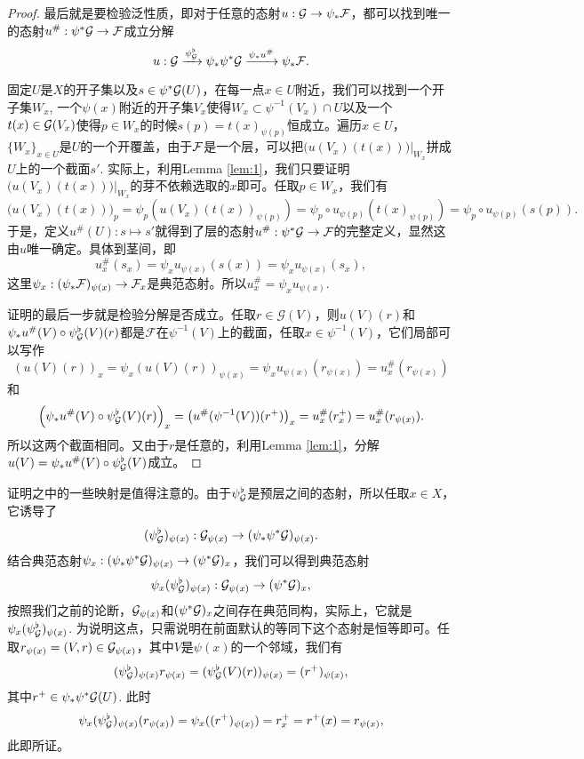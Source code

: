 \begin{proof}
	最后就是要检验泛性质，即对于任意的态射$u:\mathcal{G} \to \psi_*\mathcal{F}$，都可以找到唯一的态射$u^\#:\psi^*\mathcal{G} \to \mathcal{F}$成立分解
	\[
		u:\mathcal{G}\xrightarrow{\psi^\flat_{\mathcal{G}}} \psi_*\psi^*\mathcal{G} \xrightarrow{\psi_*u^\#} \psi_*\mathcal{F}.
	\]

	固定$U$是$X$的开子集以及$s\in \psi^*\mathcal{G}(U)$，在每一点$x\in U$附近，我们可以找到一个开子集$W_x$, 一个$\psi(x)$附近的开子集$V_x$使得$W_x\subset \psi^{-1}(V_x)\cap U$以及一个$t(x)\in \mathcal{G}(V_x)$使得$p\in W_x$的时候$s(p)=t(x)_{\psi(p)}$恒成立。遍历$x\in U$，$\{W_x\}_{x\in U}$是$U$的一个开覆盖，由于$\mathcal{F}$是一个层，可以把$\bigl(u(V_x)(t(x))\bigr)|_{W_x}$拼成$U$上的一个截面$s'$. 实际上，利用Lemma \ref{lem:1}，我们只要证明$\bigl(u(V_x)(t(x))\bigr)|_{W_x}$的芽不依赖选取的$x$即可。任取$p\in W_x$，我们有
	\[
	\bigl(u(V_x)(t(x))\bigr)_p=\psi_p\left(u(V_x)(t(x))_{\psi(p)}\right)=\psi_p\circ u_{\psi(p)}(t(x)_{\psi(p)})=\psi_p\circ u_{\psi(p)}(s(p)).
	\]
	于是，定义$u^\#(U):s\mapsto s'$就得到了层的态射$u^\#:\psi^*\mathcal{G} \to \mathcal{F}$的完整定义，显然这由$u$唯一确定。具体到茎间，即
	\[
	u^\#_x(s_x)=\psi_x u_{\psi(x)}(s(x))=\psi_x u_{\psi(x)}(s_x),
	\]
	这里$\psi_x:(\psi_*\mathcal{F})_{\psi(x)}\to \mathcal{F}_x$是典范态射。所以$u^\#_x=\psi_x u_{\psi(x)}$. 

	证明的最后一步就是检验分解是否成立。任取$r\in \mathcal{G}(V)$，则$u(V)(r)$和$\psi_*u^\#(V)\circ \psi^\flat_{\mathcal{G}}(V)(r)$都是$\mathcal{F}$在$\psi^{-1}(V)$上的截面，任取$x\in \psi^{-1}(V)$，它们局部可以写作
	\[
	(u(V)(r))_x=\psi_x (u(V)(r))_{\psi(x)}=\psi_x u_{\psi(x)}(r_{\psi(x)})=u^\#_x(r_{\psi(x)})
	\]
	和
	\[
	\left(\psi_*u^\#(V)\circ \psi^\flat_{\mathcal{G}}(V)(r)\right)_x=\bigl(u^\#(\psi^{-1}(V))(r^+)\bigr)_x=u^\#_x(r^+_x)=u^\#_x(r_{\psi(x)}).
	\]
	所以这两个截面相同。又由于$r$是任意的，利用Lemma \ref{lem:1}，分解$u(V)=\psi_*u^\#(V)\circ \psi^\flat_{\mathcal{G}}(V)$成立。
\end{proof}

证明之中的一些映射是值得注意的。由于$\psi^\flat_{\mathcal{G}}$是预层之间的态射，所以任取$x\in X$，它诱导了
\[
	(\psi^\flat_{\mathcal{G}})_{\psi(x)}:\mathcal{G}_{\psi(x)}\to (\psi_*\psi^*\mathcal{G})_{\psi(x)}.
\]
结合典范态射$\psi_x:(\psi_*\psi^*\mathcal{G})_{\psi(x)}\to (\psi^*\mathcal{G})_{x}$，我们可以得到典范态射
\[
	\psi_x(\psi^\flat_{\mathcal{G}})_{\psi(x)}:\mathcal{G}_{\psi(x)}\to (\psi^*\mathcal{G})_{x},
\]
按照我们之前的论断，$\mathcal{G}_{\psi(x)}$和$(\psi^*\mathcal{G})_{x}$之间存在典范同构，实际上，它就是$\psi_x(\psi^\flat_{\mathcal{G}})_{\psi(x)}$. 为说明这点，只需说明在前面默认的等同下这个态射是恒等即可。任取$r_{\psi(x)}=(V,r)\in \mathcal{G}_{\psi(x)}$，其中$V$是$\psi(x)$的一个邻域，我们有
\[
	(\psi^\flat_{\mathcal{G}})_{\psi(x)}r_{\psi(x)}=(\psi^\flat_{\mathcal{G}}(V)(r))_{\psi(x)}=(r^+)_{\psi(x)},
\]
其中$r^+\in \psi_*\psi^*\mathcal{G}(U)$. 此时
\[
	\psi_x(\psi^\flat_{\mathcal{G}})_{\psi(x)}(r_{\psi(x)})=\psi_x((r^+)_{\psi(x)})=r^+_x=r^+(x)=r_{\psi(x)},
\]
此即所证。

